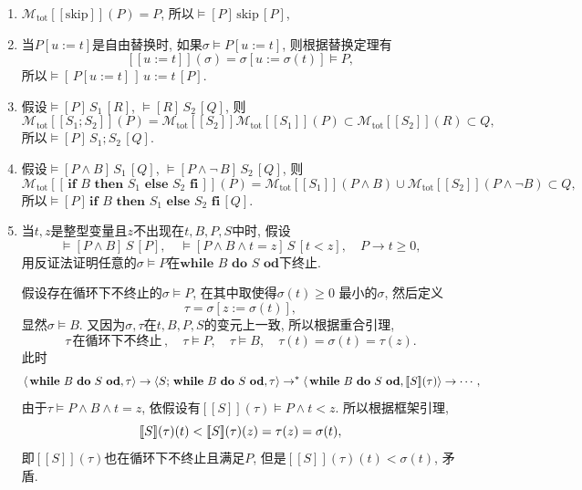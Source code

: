 \documentclass[UTF8]{ctexart}
\begin{document}
\begin{enumerate}
    \item $\mathcal{M}_{\mathrm{tot}}[\![\mathrm{skip}]\!](P)=P$,
    所以$\models[P]\,\mathrm{skip}\,[P]$,

    \item 当$P[u:=t]$是自由替换时, 如果$\sigma\models P[u:=t]$,
    则根据替换定理有
    \[
        [\![u:=t]\!](\sigma)=\sigma[u:=\sigma(t)]\models P,
    \]
    所以$\models[\,P[u:=t]\,]\,u:=t\,[P]$.

    \item 假设$\models[P]\,S_1\,[R]$, $\models[R]\,S_2\,[Q]$, 则
    \[
        \mathcal{M}_{\mathrm{tot}}[\![S_1;S_2]\!](P)=
        \mathcal{M}_{\mathrm{tot}}[\![S_2]\!]
        \mathcal{M}_{\mathrm{tot}}[\![S_1]\!](P)\subset
        \mathcal{M}_{\mathrm{tot}}[\![S_2]\!](R)\subset Q,
    \]
    所以$\models[P]\,S_1;S_2\,[Q]$.

    \item 假设$\models[P\land B]\,S_1\,[Q]$,
    $\models[P\land\neg\,B]\,S_2\,[Q]$, 则
    \[
        \mathcal{M}_{\mathrm{tot}}[\![\,\mathbf{if}\,\,B\,\,\mathbf{then}\,\,S_1\,\,
        \mathbf{else}\,\,S_2\,\,\mathbf{fi}\,]\!](P)=
        \mathcal{M}_{\mathrm{tot}}[\![S_1]\!](P\land B)\cup
        \mathcal{M}_{\mathrm{tot}}[\![S_2]\!](P\land\neg B)\subset Q,
    \]
    所以$\models[P]\,\mathbf{if}\,\,B\,\,\mathbf{then}\,\,S_1\,\,
    \mathbf{else}\,\,S_2\,\,\mathbf{fi}\,[Q]$.

    \item 当$t,z$是整型变量且$z$不出现在$t,B,P,S$中时, 假设
    \[
        \models[P\land B]\,S\,[P],\quad
        \models[P\land B\land t=z]\,S\,[t<z],\quad
        P\to t\geqslant 0,
    \]
    用反证法证明任意的$\sigma\models P$在$\mathbf{while}\,\,B\,\,
    \mathbf{do}\,\,S\,\,\mathbf{od}$下终止.

    \hspace{2.17em}
    假设存在循环下不终止的$\sigma\models P$, 在其中取使得$\sigma(t)\geqslant 0$
    最小的$\sigma$, 然后定义
    \[
        \tau=\sigma[z:=\sigma(t)],
    \]
    显然$\sigma\models B$. 又因为$\sigma,\tau$在$t,B,P,S$的变元上一致,
    所以根据重合引理,
    \[
        \tau\,\text{在循环下不终止}\,,\quad \tau\models P,\quad\tau\models B,\quad
        \tau(t)=\sigma(t)=\tau(z).
    \]
    此时
    \[
        \langle\,\mathbf{while}\,\,B\,\,\mathbf{do}\,\,S\,\,
        \mathbf{od},\tau\rangle\to\langle S;\,\mathbf{while}\,\,B
        \,\,\mathbf{do}\,\,S\,\,\mathbf{od},\tau\rangle\to^*
        \langle\,\mathbf{while}\,\,B\,\,\mathbf{do}\,\,S\,\,
        \mathbf{od},[\![S]\!](\tau)\rangle\to\cdots,\\[-1pt]
    \]
    由于$\tau\models P\land B\land t=z$,
    依假设有$[\![S]\!](\tau)\models P\land t<z$. 所以根据框架引理,
    \vspace{1pt}
    \[
        [\![S]\!](\tau)(t)<[\![S]\!](\tau)(z)=\tau(z)=\sigma(t),\\[1pt]
    \]
    即$[\![S]\!](\tau)$也在循环下不终止且满足$P$,
    但是$[\![S]\!](\tau)(t)<\sigma(t)$, 矛盾.


\end{enumerate}
\end{document}
